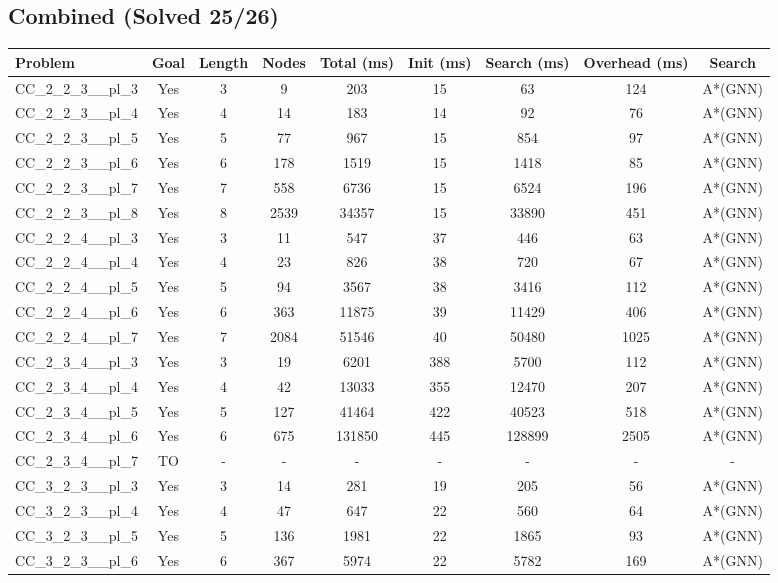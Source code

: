 \documentclass{article}
\begin{document}
\subsection*{Combined (Solved 25/26)}
\begin{tabular}{lcccccccc}
\toprule
Problem & Goal & Length & Nodes & Total (ms) & Init (ms) & Search (ms) & Overhead (ms) & Search \\
\midrule
CC\_2\_2\_3\_\_pl\_3 & Yes & 3 & 9 & 203 & 15 & 63 & 124 & A*(GNN) \\
CC\_2\_2\_3\_\_pl\_4 & Yes & 4 & 14 & 183 & 14 & 92 & 76 & A*(GNN) \\
CC\_2\_2\_3\_\_pl\_5 & Yes & 5 & 77 & 967 & 15 & 854 & 97 & A*(GNN) \\
CC\_2\_2\_3\_\_pl\_6 & Yes & 6 & 178 & 1519 & 15 & 1418 & 85 & A*(GNN) \\
CC\_2\_2\_3\_\_pl\_7 & Yes & 7 & 558 & 6736 & 15 & 6524 & 196 & A*(GNN) \\
CC\_2\_2\_3\_\_pl\_8 & Yes & 8 & 2539 & 34357 & 15 & 33890 & 451 & A*(GNN) \\
CC\_2\_2\_4\_\_pl\_3 & Yes & 3 & 11 & 547 & 37 & 446 & 63 & A*(GNN) \\
CC\_2\_2\_4\_\_pl\_4 & Yes & 4 & 23 & 826 & 38 & 720 & 67 & A*(GNN) \\
CC\_2\_2\_4\_\_pl\_5 & Yes & 5 & 94 & 3567 & 38 & 3416 & 112 & A*(GNN) \\
CC\_2\_2\_4\_\_pl\_6 & Yes & 6 & 363 & 11875 & 39 & 11429 & 406 & A*(GNN) \\
CC\_2\_2\_4\_\_pl\_7 & Yes & 7 & 2084 & 51546 & 40 & 50480 & 1025 & A*(GNN) \\
CC\_2\_3\_4\_\_pl\_3 & Yes & 3 & 19 & 6201 & 388 & 5700 & 112 & A*(GNN) \\
CC\_2\_3\_4\_\_pl\_4 & Yes & 4 & 42 & 13033 & 355 & 12470 & 207 & A*(GNN) \\
CC\_2\_3\_4\_\_pl\_5 & Yes & 5 & 127 & 41464 & 422 & 40523 & 518 & A*(GNN) \\
CC\_2\_3\_4\_\_pl\_6 & Yes & 6 & 675 & 131850 & 445 & 128899 & 2505 & A*(GNN) \\
CC\_2\_3\_4\_\_pl\_7 & TO & - & - & - & - & - & - & - \\
CC\_3\_2\_3\_\_pl\_3 & Yes & 3 & 14 & 281 & 19 & 205 & 56 & A*(GNN) \\
CC\_3\_2\_3\_\_pl\_4 & Yes & 4 & 47 & 647 & 22 & 560 & 64 & A*(GNN) \\
CC\_3\_2\_3\_\_pl\_5 & Yes & 5 & 136 & 1981 & 22 & 1865 & 93 & A*(GNN) \\
CC\_3\_2\_3\_\_pl\_6 & Yes & 6 & 367 & 5974 & 22 & 5782 & 169 & A*(GNN) \\

\end{tabular}
\end{document}
